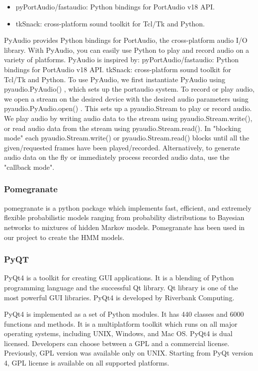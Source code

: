 \begin{itemize}
	\item pyPortAudio/fastaudio: Python bindings for PortAudio v18 API.
	\item tkSnack: cross-platform sound toolkit for Tcl/Tk and Python.
\end{itemize}

PyAudio provides Python bindings for PortAudio, the cross-platform audio I/O library. With PyAudio, you can easily use Python to play and record audio on a variety of platforms. PyAudio is inspired by:
pyPortAudio/fastaudio: Python bindings for PortAudio v18 API.
tkSnack: cross-platform sound toolkit for Tcl/Tk and Python.
To use PyAudio, we first instantiate PyAudio using pyaudio.PyAudio() , which sets up the portaudio system. To record or play audio, we open a stream on the desired device with the desired audio parameters using pyaudio.PyAudio.open() . This sets up a pyaudio.Stream to play or record audio.  We play audio by writing audio data to the stream using pyaudio.Stream.write(), or read audio data from the stream using pyaudio.Stream.read().
In "blocking mode" each pyaudio.Stream.write() or pyaudio.Stream.read() blocks until all the given/requested frames have been played/recorded. Alternatively, to generate audio data on the fly or immediately process recorded audio data, use the "callback mode". 

\subsubsection{Pomegranate}
pomegranate is a python package which implements fast, efficient, and extremely flexible
probabilistic models ranging from probability distributions to Bayesian networks to
mixtures of hidden Markov models. Pomegranate has been used in our project to create the
HMM models.	
\subsubsection{PyQT}
PyQt4 is a toolkit for creating GUI applications. It is a blending of Python programming language and the successful Qt library. Qt library is one of the most powerful GUI libraries. PyQt4 is developed by Riverbank Computing. 

PyQt4 is implemented as a set of Python modules. It has 440 classes and 6000 functions and methods. It is a multiplatform toolkit which runs on all major operating systems, including UNIX, Windows, and Mac OS. PyQt4 is dual licensed. Developers can choose between a GPL and a commercial license. Previously, GPL version was available only on UNIX. Starting from PyQt version 4, GPL license is available on all supported platforms.


